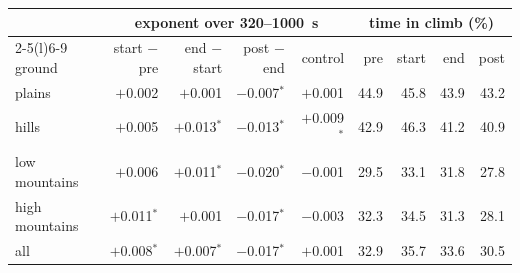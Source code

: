 \begin{tabular}{@{}l r r r r r r r r@{}}
\toprule
 & \multicolumn{4}{c}{exponent over 320--1000~s} & \multicolumn{4}{c}{time in climb (\%)} \\
\cmidrule(lr){2-5}\cmidrule(l){6-9}
ground & start $-$ pre & end $-$ start & post $-$ end & control & pre & start & end & post \\
\midrule
plains & $+$0.002 & $+$0.001 & $-$0.007$^\ast$ & $+$0.001 & 44.9 & 45.8 & 43.9 & 43.2 \\
hills & $+$0.005 & $+$0.013$^\ast$ & $-$0.013$^\ast$ & $+$0.009$^\ast$ & 42.9 & 46.3 & 41.2 & 40.9 \\
low mountains & $+$0.006 & $+$0.011$^\ast$ & $-$0.020$^\ast$ & $-$0.001 & 29.5 & 33.1 & 31.8 & 27.8 \\
high mountains & $+$0.011$^\ast$ & $+$0.001 & $-$0.017$^\ast$ & $-$0.003 & 32.3 & 34.5 & 31.3 & 28.1 \\
all & $+$0.008$^\ast$ & $+$0.007$^\ast$ & $-$0.017$^\ast$ & $+$0.001 & 32.9 & 35.7 & 33.6 & 30.5 \\
\bottomrule
\end{tabular}
